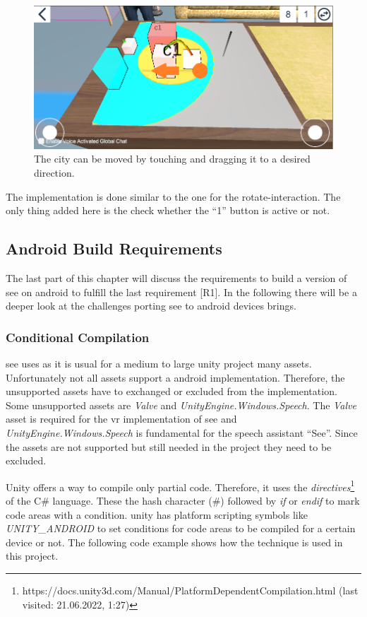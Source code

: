 \begin{figure}[htb]
    \centering
    \includegraphics[width=1\textwidth]{Implementation/img/move.png}
    \caption{The \gls{city} can be moved by touching and dragging it to a desired direction.}\label{fig:left}
\end{figure}

The implementation is done similar to the one for the rotate-interaction. 
The only thing added here is the check whether the \enquote{1} button is active or not.

\subsection{Android Build Requirements}
The last part of this chapter will discuss the requirements to build a version of \gls{see} on \gls{android} to fulfill the last requirement [R1].
In the following there will be a deeper look at the challenges porting \gls{see} to android devices brings. 


\subsubsection{Conditional Compilation}

\gls{see} uses as it is usual for a medium to large \gls{unity} project many \glspl{asset}.
Unfortunately not all \glspl{asset} support a \gls{android} implementation.
Therefore, the unsupported assets have to exchanged or excluded from the implementation.
Some unsupported \glspl{asset} are \textit{Valve} and \textit{UnityEngine.Windows.Speech}.
The \textit{Valve} \gls{asset} is required for the \gls{vr} implementation of \gls{see} and \textit{UnityEngine.Windows.Speech} is fundamental for the speech assistant \enquote{See}.
Since the \glspl{asset} are not supported but still needed in the project they need to be excluded. 

Unity offers a way to compile only partial code. 
Therefore, it uses the \textit{directives}\footnote{https://docs.unity3d.com/Manual/PlatformDependentCompilation.html (last visited: 21.06.2022, 1:27)} of the C\# language. 
These the hash character (\#) followed by \textit{if} or \textit{endif} to mark code areas with a condition.
\gls{unity} has platform scripting symbols like \textit{UNITY\_ANDROID} to set conditions for code areas to be compiled for a certain device or not.
The following code example shows how the technique is used in this project. 

